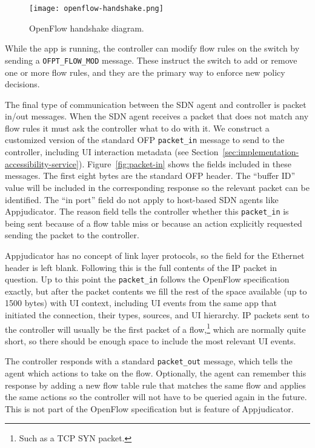 \begin{wrapfigure}{R}{0.4\textwidth}
	\centering
	\texttt{[image: openflow-handshake.png]}
    \caption{OpenFlow handshake diagram.}
    \label{fig:openflow-handshake}
\end{wrapfigure}

While the app is running, the controller can modify flow rules on the
switch by sending a \texttt{OFPT\_FLOW\_MOD} message. These instruct the switch
to add or remove one or more flow rules, and they are the primary way to enforce
new policy decisions.

The final type of communication between the SDN agent and controller is packet
in/out messages. When the SDN agent receives a packet that does not match any
flow rules it must ask the controller what to do with it. We construct a
customized version of the standard OFP \texttt{packet\_in} message to send to
the controller, including UI interaction metadata (see
Section~\ref{sec:implementation-accessibility-service}).
Figure~\ref{fig:packet-in} shows the fields included in these messages. The
first eight bytes are the standard OFP header. The ``buffer ID'' value will be
included in the corresponding response so the relevant packet can be identified.
The ``in port'' field do not apply to host-based SDN agents like Appjudicator.
The reason field tells the controller whether this \texttt{packet\_in} is being
sent because of a flow table miss or because an action explicitly requested
sending the packet to the controller.

Appjudicator has no concept of link layer protocols, so the field for the
Ethernet header is left blank. Following this is the full contents of the IP
packet in question. Up to this point the \texttt{packet\_in} follows the
OpenFlow specification exactly, but after the packet contents we fill the rest
of the space available (up to 1500 bytes) with UI context, including UI events
from the same app that initiated the connection, their types, sources, and UI
hierarchy. IP packets sent to the controller will usually be the first packet of
a flow,\footnote{Such as a TCP SYN packet.} which are normally quite short, so
there should be enough space to include the most relevant UI events.

The controller responds with a standard \texttt{packet\_out} message, which
tells the agent which actions to take on the flow. Optionally, the agent can
remember this response by adding a new flow table rule that matches the same
flow and applies the same actions so the controller will not have to be queried
again in the future. This is not part of the OpenFlow specification but is
feature of Appjudicator.

